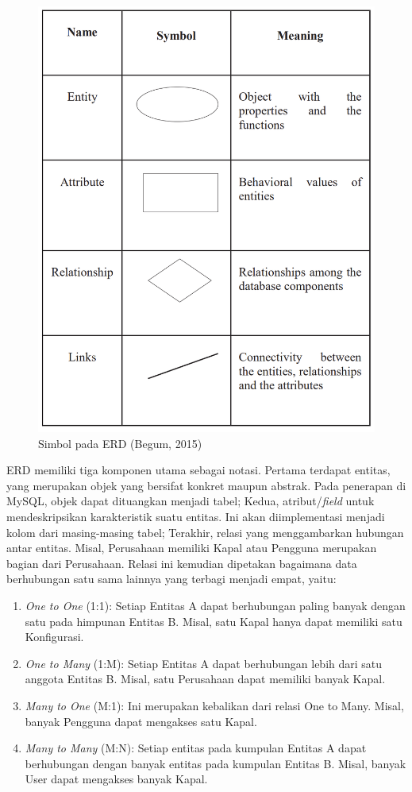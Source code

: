 \begin{figure}[!h]
    \includegraphics[width=.62\linewidth, center]{images/tinjauan-pustaka/fig-erd.png}
    \caption{Simbol pada ERD (Begum, 2015)}
    \label{fig:erd-notation}
\end{figure}

ERD memiliki tiga komponen utama sebagai notasi. Pertama terdapat entitas, yang merupakan objek yang bersifat konkret maupun abstrak. Pada penerapan di MySQL, objek dapat dituangkan menjadi tabel; Kedua, atribut/\textit{field} untuk mendeskripsikan karakteristik suatu entitas. Ini akan diimplementasi menjadi kolom dari masing-masing tabel; Terakhir, relasi yang menggambarkan hubungan antar entitas. Misal, Perusahaan memiliki Kapal atau Pengguna merupakan bagian dari Perusahaan. Relasi ini kemudian dipetakan bagaimana data berhubungan satu sama lainnya yang terbagi menjadi empat, yaitu:
\begin{enumerate}
    \item \textit{One to One} (1:1): Setiap Entitas A dapat berhubungan paling banyak dengan satu pada himpunan Entitas B. Misal, satu Kapal hanya dapat memiliki satu Konfigurasi.
    \item \textit{One to Many} (1:M): Setiap Entitas A dapat berhubungan lebih dari satu anggota Entitas B. Misal, satu Perusahaan dapat memiliki banyak Kapal.
    \item \textit{Many to One} (M:1): Ini merupakan kebalikan dari relasi One to Many. Misal, banyak Pengguna dapat mengakses satu Kapal.
    \item \textit{Many to Many} (M:N): Setiap entitas pada kumpulan Entitas A dapat berhubungan dengan banyak entitas pada kumpulan Entitas B. Misal, banyak User dapat mengakses banyak Kapal.
\end{enumerate}

